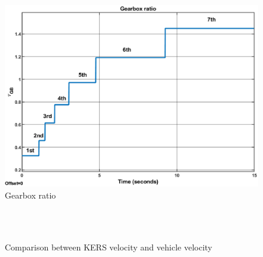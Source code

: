 \documentclass[11pt]{article}
\begin{document}
\begin{figure}[H]
	\centering
	\includegraphics[width=.6\textwidth]{Images/Results_Dynamics/Discharge/Gearbox_ratio.eps}
	\caption{Gearbox ratio}
	\label{fig: gbratiodis}
\end{figure}
 
\begin{figure}[H]
	\centering
	 \\
	 \\
	\caption{Comparison between KERS velocity \protect{} and vehicle velocity \protect{}}
	\label{fig: kers vel plus vehicle vel}
\end{figure}
\end{document}
